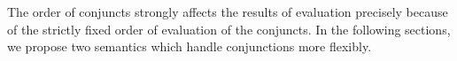 \begin{comment}
\[
\begin{array}{l}
\inbr{\{\}, 1, \mbox{\lstinline{revers}}^o \, [1] \; \alpha_0 : \epsilon} 
\xrightarrow{\circ} \\
\inbr{\{\alpha_1 = 1; \alpha_2 = []\}, 4, \mbox{\lstinline{revers}}^o \, \alpha_2 \; \alpha_3 : \mbox{\lstinline{append}}^o \, \alpha_3 \; [\alpha_1] \; \alpha_0 : \epsilon}
\xrightarrow{\circ} \\
\inbr{\{\alpha_1 = 1; \alpha_2 = []; \alpha_3 = []\}, 4, \mbox{\lstinline{append}}^o \, \alpha_3 \; [\alpha_1] \; \alpha_0 : \epsilon} 
\xrightarrow{\circ} \\
\inbr{\{\alpha_1 = 1; \alpha_2 = []; \alpha_3 = []\; \alpha_0 = [\alpha_1]\}, \epsilon}
\xrightarrow{\{\alpha_1 = 1; \alpha_2 = []; \alpha_3 = []\; \alpha_0 = [\alpha_1]\}} \emptyset
\end{array}
\]
\end{comment}

The order of conjuncts strongly affects the results of evaluation precisely because of the strictly fixed order of evaluation of the conjuncts. In the following sections,
we propose two semantics which handle conjunctions more flexibly.
